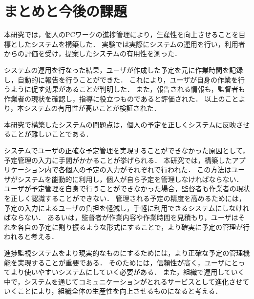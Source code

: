 \section{まとめと今後の課題}
本研究では，個人のPCワークの進捗管理により，生産性を向上させることを目標としたシステムを構築した．
実験では実際にシステムの運用を行い，利用者からの評価を受け，提案したシステムの有用性を測った．

システムの運用を行なった結果，ユーザが作成した予定を元に作業時間を記録し，自動的に報告を行うことができた．
これにより，ユーザが自身の作業を行うように促す効果があることが判明した．
また，報告される情報も，監督者も作業者の現状を確認し，指導に役立つものであると評価された．
以上のことより，本システムの有用性が高いことが検証された．

本研究で構築したシステムの問題点は，個人の予定を正しくシステムに反映させることが難しいことである．

システムでユーザの正確な予定管理を実現することができなかった原因として，予定管理の入力に手間がかかることが挙げられる．
本研究では，構築したアプリケーション内で各個人の予定の入力がそれぞれで行われた．
この方法はユーザがシステムを能動的に利用し，個人が自ら予定を管理しなければならない．
ユーザが予定管理を自身で行うことができなかった場合，監督者も作業者の現状を正しく認識することができない．
管理される予定の精度を高めるためには，予定の入力によるユーザの負担を軽減し，手軽に利用できるシステムにしなければならない．
あるいは，監督者が作業内容や作業時間を見積もり，ユーザはそれを各自の予定に割り振るような形式にすることで，より確実に予定の管理が行われると考える．

進捗監視システムをより現実的なものにするためには，より正確な予定の管理機能を実現することが重要である．
そのためには，信頼性が高く，ユーザにとってより使いやすいシステムにしていく必要がある．
また，組織で運用していく中で，システムを通じてコミュニケーションがとれるサービスとして進化させていくことにより，組織全体の生産性を向上させるものになると考える．
